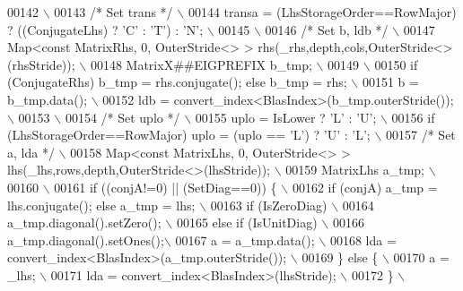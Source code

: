\begin{DoxyCode}
00142 \textcolor{preprocessor}{\(\backslash\)}
00143 \textcolor{preprocessor}{}\textcolor{comment}{/* Set trans */}\textcolor{preprocessor}{ \(\backslash\)}
00144 \textcolor{preprocessor}{   transa = (LhsStorageOrder==RowMajor) ? ((ConjugateLhs) ? 'C' : 'T') : 'N'; \(\backslash\)}
00145 \textcolor{preprocessor}{\(\backslash\)}
00146 \textcolor{preprocessor}{}\textcolor{comment}{/* Set b, ldb */}\textcolor{preprocessor}{ \(\backslash\)}
00147 \textcolor{preprocessor}{   Map<const MatrixRhs, 0, OuterStride<> > rhs(\_rhs,depth,cols,OuterStride<>(rhsStride)); \(\backslash\)}
00148 \textcolor{preprocessor}{   MatrixX##EIGPREFIX b\_tmp; \(\backslash\)}
00149 \textcolor{preprocessor}{\(\backslash\)}
00150 \textcolor{preprocessor}{   if (ConjugateRhs) b\_tmp = rhs.conjugate(); else b\_tmp = rhs; \(\backslash\)}
00151 \textcolor{preprocessor}{   b = b\_tmp.data(); \(\backslash\)}
00152 \textcolor{preprocessor}{   ldb = convert\_index<BlasIndex>(b\_tmp.outerStride()); \(\backslash\)}
00153 \textcolor{preprocessor}{\(\backslash\)}
00154 \textcolor{preprocessor}{}\textcolor{comment}{/* Set uplo */}\textcolor{preprocessor}{ \(\backslash\)}
00155 \textcolor{preprocessor}{   uplo = IsLower ? 'L' : 'U'; \(\backslash\)}
00156 \textcolor{preprocessor}{   if (LhsStorageOrder==RowMajor) uplo = (uplo == 'L') ? 'U' : 'L'; \(\backslash\)}
00157 \textcolor{preprocessor}{}\textcolor{comment}{/* Set a, lda */}\textcolor{preprocessor}{ \(\backslash\)}
00158 \textcolor{preprocessor}{   Map<const MatrixLhs, 0, OuterStride<> > lhs(\_lhs,rows,depth,OuterStride<>(lhsStride)); \(\backslash\)}
00159 \textcolor{preprocessor}{   MatrixLhs a\_tmp; \(\backslash\)}
00160 \textcolor{preprocessor}{\(\backslash\)}
00161 \textcolor{preprocessor}{   if ((conjA!=0) || (SetDiag==0)) \{ \(\backslash\)}
00162 \textcolor{preprocessor}{     if (conjA) a\_tmp = lhs.conjugate(); else a\_tmp = lhs; \(\backslash\)}
00163 \textcolor{preprocessor}{     if (IsZeroDiag) \(\backslash\)}
00164 \textcolor{preprocessor}{       a\_tmp.diagonal().setZero(); \(\backslash\)}
00165 \textcolor{preprocessor}{     else if (IsUnitDiag) \(\backslash\)}
00166 \textcolor{preprocessor}{       a\_tmp.diagonal().setOnes();\(\backslash\)}
00167 \textcolor{preprocessor}{     a = a\_tmp.data(); \(\backslash\)}
00168 \textcolor{preprocessor}{     lda = convert\_index<BlasIndex>(a\_tmp.outerStride()); \(\backslash\)}
00169 \textcolor{preprocessor}{   \} else \{ \(\backslash\)}
00170 \textcolor{preprocessor}{     a = \_lhs; \(\backslash\)}
00171 \textcolor{preprocessor}{     lda = convert\_index<BlasIndex>(lhsStride); \(\backslash\)}
00172 \textcolor{preprocessor}{   \} \(\backslash\)}

\end{DoxyCode}
